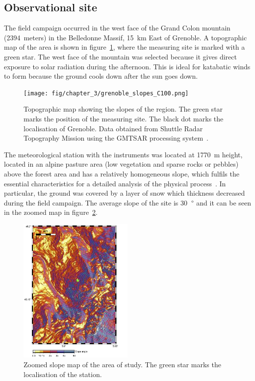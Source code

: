 \subsection{Observational site}

The field campaign occurred in the west face of the Grand Colon mountain (2394~meters) in the Belledonne Massif, 15~km East of Grenoble. A topographic map of the area is shown in figure~\ref{fig:obs_site}, where the measuring site is marked with a green star. The west face of the mountain was selected because it gives direct exposure to solar radiation during the afternoon. This is ideal for katabatic winds to form because the ground cools down after the sun goes down.

\begin{figure}[!ht]
  \begin{center}
  \texttt{[image: fig/chapter\_3/grenoble\_slopes\_C100.png]}
  \caption{Topographic map showing the slopes of the region. The green star marks the position of the measuring site. The black dot marks the localisation of Grenoble. Data obtained from Shuttle Radar Topography Mission using the GMTSAR processing system~\citep{sandwell2011gmtsar}.}
  \label{fig:obs_site}
  \end{center}
\end{figure}

The meteorological station with the instruments was located at 1770~m height, located in an alpine pasture area (low vegetation and sparse rocks or pebbles) above the forest area and
has a relatively homogeneous slope, which fulfils the essential characteristics for a detailed analysis of the physical process~\citep{blein2016observation}. In particular, the ground was covered by a layer of snow which thickness decreased during the field campaign. The average slope of the site is 30~$\degree$ and it can be seen in the zoomed map in figure~\ref{fig:obs_site_zoom}.

\begin{figure}[!ht]
  \begin{center}
  \includegraphics[width=0.5\textwidth]{fig/chapter_3/grenoble_slopes_C100_zoom.png}
  \caption{Zoomed slope map of the area of study. The green star marks the localisation of the station.}
  \label{fig:obs_site_zoom}
  \end{center}
\end{figure}

